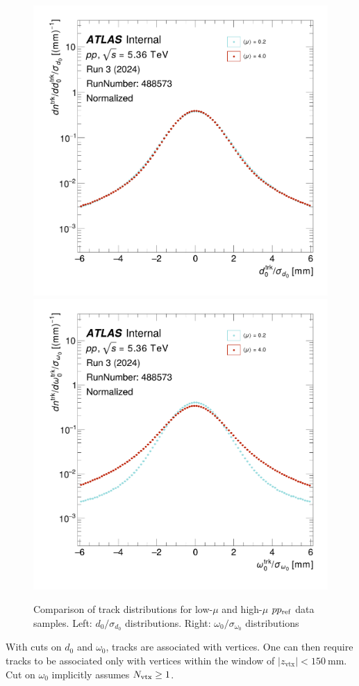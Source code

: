 \begin{figure}[h]
    \centering
    \includegraphics[width=0.49\linewidth]{images/trk_d0_norm_488573.png}
    \includegraphics[width=0.49\linewidth]{images/trk_omega0_norm_488573.png}
    \caption{Comparison of track distributions for low-$\mu$ and high-$\mu$ $pp_{\mathrm{ref}}$ data samples. Left: $d_0/\sigma_{d_0}$ distributions. Right: $\omega_0/\sigma_{\omega_0}$ distributions}
    \label{fig:lowmu_highmu_ip_norm}
\end{figure}

{\blue With cuts on $d_0$ and $\omega_0$, tracks are associated with vertices. One can then require tracks to be associated only with vertices within the window of $|z_\text{vtx}|<\qty{150}{\mm}$. Cut on $\omega_0$ implicitly assumes $N_\text{vtx} \geq 1$.}





